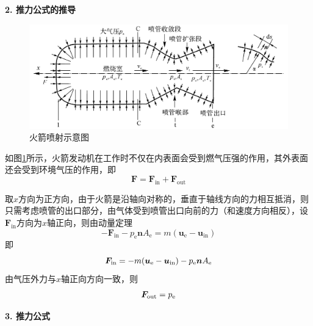 \noindent \textbf{2. 推力公式的推导}
\begin{figure}[!htb]
	\centering
	\includegraphics[width=0.8\linewidth]{pic/推力推导.png}
	\vspace*{-1em}
	\caption{火箭喷射示意图}
	\label{推力推导}
\end{figure}

如图\ref{推力推导}所示，火箭发动机在工作时不仅在内表面会受到燃气压强的作用，其外表面还会受到环境气压的作用，即
\begin{equation}
	\bm{F} = \bm{F}_{\text{in}} + \bm{F}_{\text{out}}
\end{equation}

取$x$方向为正方向，由于火箭是沿轴向对称的，垂直于轴线方向的力相互抵消，则只需考虑喷管的出口部分，由气体受到喷管出口向前的力（和速度方向相反），设$\bm{F}_{\text{in}}$方向为$x$轴正向，则由动量定理
\begin{equation}
		-\bm{F}_{\text{in}} - p_{\text{e}} \bm{n} A_{\text{e}} = m (\bm{u}_{\text{e}} - \bm{u}_{\text{in}})
\end{equation}
即
\begin{equation}
	\bm{F}_{\text{in}} = - m (\bm{u}_{\text{e}} - \bm{u}_{\text{in}}) - p_{\rm{e}} \bm{n} A_{\rm{e}}
\end{equation}
由气压外力与$x$轴正向方向一致，则
\begin{equation}
	\bm{F}_{\text{out}} = p_{{\rm{e}}}
\end{equation}
\vspace*{1em}

\noindent \textbf{3. 推力公式}

